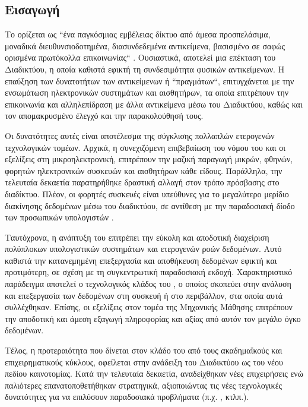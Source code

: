 \subsection{Εισαγωγή}
Το  ορίζεται ως ``ένα παγκόσμιας εμβέλειας δίκτυο από άμεσα προσπελάσιμα, μοναδικά διευθυνσιοδοτημένα, διασυνδεδεμένα αντικείμενα, βασισμένο σε σαφώς ορισμένα πρωτόκολλα επικοινωνίας`` \cite{ATZORI20102787}.
Ουσιαστικά, αποτελεί μια επέκταση του Διαδικτύου, η οποία καθιστά εφικτή τη συνδεσιμότητα φυσικών αντικείμενων.
Η επαύξηση των δυνατοτήτων των αντικείμενων ή ``πραγμάτων``, επιτυγχάνεται με την ενσωμάτωση ηλεκτρονικών συστημάτων και αισθητήρων, τα οποία επιτρέπουν την επικοινωνία και αλληλεπίδραση με άλλα αντικείμενα μέσω του Διαδικτύου, καθώς και τον απομακρυσμένο έλεγχό και την παρακολούθησή τους.
\par
Οι δυνατότητες αυτές είναι αποτέλεσμα της σύγκλισης πολλαπλών ετερογενών τεχνολογικών τομέων.
Αρχικά, η συνεχιζόμενη επιβεβαίωση του νόμου του  και οι εξελίξεις στη μικροηλεκτρονική, επιτρέπουν την μαζική παραγωγή μικρών, φθηνών, φορητών ηλεκτρονικών συσκευών και αισθητήρων κάθε είδους.
Παράλληλα, την τελευταία δεκαετία παρατηρήθηκε δραστική αλλαγή στον τρόπο πρόσβασης στο διαδίκτυο.
Πλέον, οι φορητές συσκευές είναι υπεύθυνες για το μεγαλύτερο μερίδιο διακίνησης δεδομένων μέσω του διαδικτύου, σε αντίθεση με την παραδοσιακή δίοδο των προσωπικών υπολογιστών \cite{cisco2019}.
\par
Ταυτόχρονα, η ανάπτυξη του  επιτρέπει την εύκολη και αποδοτική διαχείριση πολύπλοκων υπολογιστικών συστημάτων και ετερογενών ροών δεδομένων.
Αυτό καθιστά την κατανεμημένη επεξεργασία και αποθήκευση δεδομένων εφικτή και προτιμότερη, σε σχέση με τη συγκεντρωτική παραδοσιακή εκδοχή.
Χαρακτηριστικό παράδειγμα αποτελεί ο τεχνολογικός κλάδος του , ο οποίος σκοπεύει στην ανάλυση και επεξεργασία των δεδομένων στη συσκευή ή στο περιβάλλον, στα οποία αυτά συλλέχθηκαν.
Επίσης, οι εξελίξεις στον τομέα της Μηχανικής Μάθησης επιτρέπουν την αποδοτική και άμεση εξαγωγή πληροφορίας και αξίας από αυτόν τον μεγάλο όγκο δεδομένων.
\par
Τέλος, η προτεραιότητα που δίνεται στον κλάδο του  από τους ακαδημαϊκούς και επιχειρηματικούς κύκλους, οφείλεται στην ανάδειξη του Διαδικτύου ως του νέου πεδίου καινοτομίας.
Κατά την τελευταία δεκαετία, αναδείχθηκαν νέες επιχειρήσεις ενώ παλιότερες επανατοποθετήθηκαν στρατηγικά, αξιοποιώντας τις νέες τεχνολογικές δυνατότητες για να επιλύσουν παραδοσιακά προβλήματα (π.χ. , κτλπ.).
